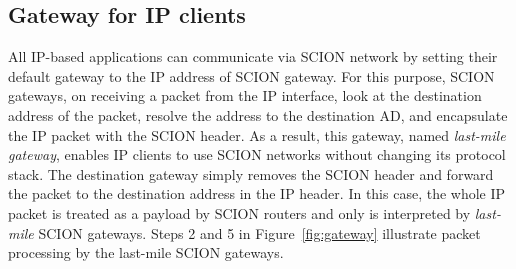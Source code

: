 \subsection{Gateway for IP clients}
All IP-based applications can communicate via SCION network by setting their default gateway to the IP address of SCION gateway. For this purpose, SCION gateways, on receiving a packet from the IP interface, look at the destination address of the packet, resolve the address to the destination AD, and encapsulate the IP packet with the SCION header. As a result, this gateway, named {\em last-mile gateway}, enables IP clients to use SCION networks without changing its protocol stack. The destination gateway simply removes the SCION header and forward the packet to the destination address in the IP header. In this case, the whole IP packet is treated as a payload by SCION routers and only is interpreted by {\em last-mile} SCION gateways. Steps 2 and 5 in Figure~\ref{fig:gateway} illustrate packet processing by the last-mile SCION gateways.

